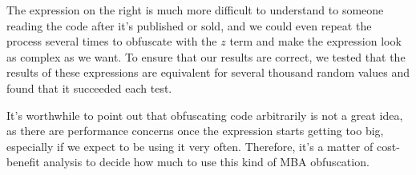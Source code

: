 The expression on the right is much more difficult to understand to someone 
reading the code after it's published or sold, and we could even repeat the process
several times to obfuscate with the $z$ term and make the expression look as complex 
as we want. To ensure that our results are correct, we tested that the results of 
these expressions are equivalent for several thousand random values and found that
it succeeded each test.
\par It's worthwhile to point out that obfuscating code arbitrarily is not a great idea,
as there are performance concerns once the expression starts getting too big, especially
if we expect to be using it very often. Therefore, it's a matter of cost-benefit
analysis to decide how much to use this kind of MBA obfuscation. 
